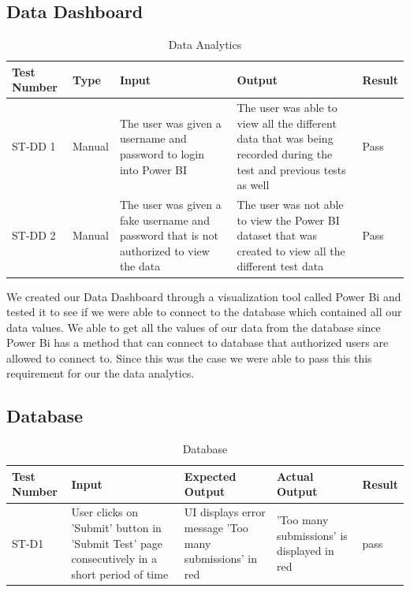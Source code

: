 \documentclass[12pt, titlepage]{article}
\begin{document}
\subsection{Data Dashboard}
\begin{table}[H]
  \begin{tabular}{| p{} | p{}| p{}| p{}| p{}|}
    \hline
    \rowcolor[gray]{0.9}
    Test Number & Type & Input & Output & Result\\
    \hline
    ST-DD 1 & Manual & The user was given a username and password to login into Power BI & The user was able to view all the different data that was being recorded during the test and previous tests as well & Pass\\
    \hline
    ST-DD 2 & Manual & The user was given a fake username and password that is not authorized to view the data & The user was not able to view the Power BI dataset that was created to view all the different test data & Pass\\
    \hline
  \end{tabular}
  \caption{Data Analytics}
  \end{table} 

We created our Data Dashboard through a visualization tool called Power Bi and tested it to see if we were able to connect to the database which contained all our data values. We able to get all the values of our data from the database since Power Bi has a method that can connect to database that authorized users are allowed to connect to. Since this was the case we were able to pass this this requirement for our the data analytics.


\subsection{Database}
\begin{table}[H]
\begin{tabular}{| p{} | p{}| p{}| p{}| p{}|}
  \hline
  \rowcolor[gray]{0.9}
  Test Number & Input & Expected Output & Actual Output & Result\\
  \hline
  ST-D1 & User clicks on 'Submit' button in 'Submit Test' page consecutively in a short period of time & UI displays error message 'Too many submissions' in red & 'Too many submissions' is displayed in red & pass \\
  \hline
\end{tabular}
\caption{Database}
\end{table}
\end{document}
